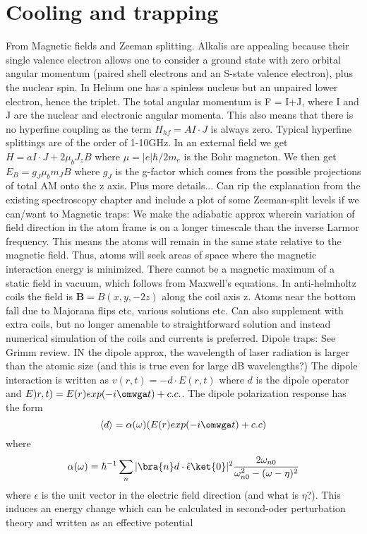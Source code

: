 \section{Cooling and trapping}
From \cite{PitaevskiiStringari}
	Magnetic fields and Zeeman splitting.
	Alkalis are appealing because their single valence electron allows one to consider a ground state with zero orbital angular momentum (paired shell electrons and an S-state valence electron), plus the nuclear spin. In Helium one has a spinless nucleus but an unpaired lower electron, hence the triplet.
	The total angular momentum is F = I+J, where I and J are the nuclear and electronic angular momenta.
	This also means that there is no hyperfine coupling as the term $H_{hf}=AI\cdot J$ is always zero. Typical hyperfine splittings are of the order of 1-10GHz. In an external field we get $H= aI\cdot J+2\mu_b J_z B$ where $\mu = |e|\hbar/2m_e$ is the Bohr magneton. We then get $E_B = g_J \mu_b m_J B$ where $g_J$ is the g-factor which comes from the possible projections of total AM onto the z axis.
	Plus more details... Can rip the explanation from the existing spectroscopy chapter and include a plot of some Zeeman-split levels if we can/want to 
	Magnetic traps: We make the adiabatic approx wherein variation of field direction in the atom frame is on a longer timescale than the inverse Larmor frequency. This means the atoms will remain in the same state relative to the magnetic field. Thus, atoms will seek areas of space where the magnetic interaction energy is minimized. 
	There cannot be a magnetic maximum of a static field in vacuum, which follows from Maxwell's equations. 
	In anti-helmholtz coils the field is $\textbf{B} = B(x,y,-2z)$ along the coil axis z. Atoms near the bottom fall due to Majorana flips etc, various solutions etc. Can also supplement with extra coils, but no longer amenable to straightforward solution and instead numerical simulation of the coils and currents is preferred.
	Dipole traps:
	See Grimm review. IN the dipole approx, the wavelength of laser radiation is larger than the atomic size (and this is true even for large dB wavelengths?)
	The dipole interaction is written as $v(r,t) = -d\cdot E(r,t)$ where $d$ is the dipole operator and $E)r,t) = E(r)exp(-i\omwga t) + c.c.$. The dipole polarization response has the form
	$$
	\langle d\rangle = \alpha(\omega) (E(r)exp(-i\omwga t) + c.c)
	$$
	where
	$$
	\alpha(\omega) = \hbar^{-1} \sum_n |\bra{n} d\cdot\hat{\epsilon}\ket{0}|^2 \frac{2\omega_{n0}}{\omega_{n0}^{2}-(\omega-\eta)^2}
	$$
	where $\epsilon$ is the unit vector in the electric field direction (and what is $\eta$?). This induces an energy change which can be calculated in second-oder perturbation theory and written as an effective potential
